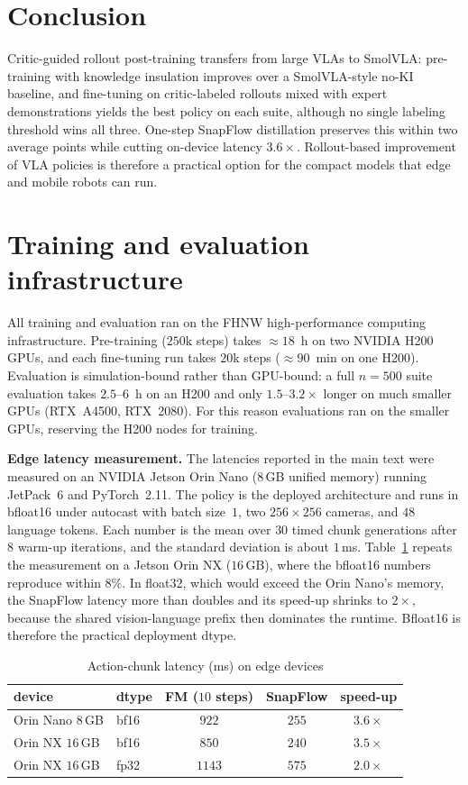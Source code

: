 \documentclass[conference]{IEEEtran}
\begin{document}
\section{Conclusion}
Critic-guided rollout post-training transfers from large VLAs to SmolVLA: pre-training
with knowledge insulation improves over a SmolVLA-style no-KI baseline, and fine-tuning on
critic-labeled rollouts mixed with expert demonstrations yields the best policy on each
suite, although no single labeling threshold wins all three. One-step SnapFlow
distillation preserves this within two average points while cutting on-device latency
$3.6\times$. Rollout-based improvement of VLA policies is therefore a practical option for
the compact models that edge and mobile robots can run.

\appendices
\section{Training and evaluation infrastructure}
\label{app:compute}
All training and evaluation ran on the FHNW high-performance computing infrastructure.
Pre-training ($250$k steps) takes $\approx18$~h on two NVIDIA H200 GPUs, and each
fine-tuning run takes $20$k steps ($\approx90$~min on one H200). Evaluation is
simulation-bound rather than GPU-bound: a full $n{=}500$ suite evaluation takes
$2.5$--$6$~h on an H200 and only $1.5$--$3.2\times$ longer on much smaller GPUs
(RTX~A4500, RTX~2080). For this reason evaluations ran on the smaller GPUs, reserving the
H200 nodes for training.

\textbf{Edge latency measurement.} The latencies reported in the main text were measured
on an NVIDIA Jetson Orin Nano ($8$\,GB unified memory) running JetPack~6 and
PyTorch~2.11. The policy is the deployed architecture and runs in bfloat16 under autocast
with batch size~$1$, two $256{\times}256$ cameras, and $48$ language tokens. Each number
is the mean over $30$ timed chunk generations after $8$ warm-up iterations, and the
standard deviation is about $1$\,ms. Table~\ref{tab:edge} repeats the measurement on a
Jetson Orin NX ($16$\,GB), where the bfloat16 numbers reproduce within $8\%$. In float32,
which would exceed the Orin Nano's memory, the SnapFlow latency more than doubles and its
speed-up shrinks to $2\times$, because the shared vision-language prefix then dominates
the runtime. Bfloat16 is therefore the practical deployment dtype.

\begin{table}[t]
\caption{Action-chunk latency (ms) on edge devices}
\label{tab:edge}
\begin{center}
\begin{tabular}{llccc}
\toprule
device & dtype & FM ($10$ steps) & SnapFlow & speed-up \\
\midrule
Orin Nano $8$\,GB & bf16 & $922$ & $255$ & $3.6\times$ \\
Orin NX $16$\,GB  & bf16 & $850$ & $240$ & $3.5\times$ \\
Orin NX $16$\,GB  & fp32 & $1143$ & $575$ & $2.0\times$ \\
\bottomrule
\end{tabular}
\end{center}
\end{table}
\end{document}
